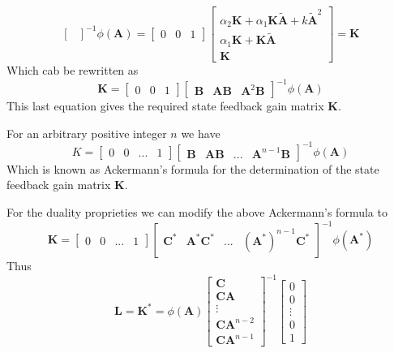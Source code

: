 \documentclass[12pt,a4paper,oneside]{book}
\begin{document}
\begin{onehalfspace}
\begin{equation}
\begin{bmatrix}
	\end{bmatrix}^{-1} \phi(\mathbf{A})=
	\begin{bmatrix} 
		0&0&1
	\end{bmatrix}
	\begin{bmatrix}
		\alpha_2\mathbf{K}+\alpha_1\mathbf{K}\tilde{\mathbf{A}}+k\tilde{\mathbf{A}}^2 \\ 
		\alpha_1\mathbf{K}+\mathbf{K}\tilde{\mathbf{A}} \\
		\mathbf{K}
	\end{bmatrix} = \mathbf{K}
\end{equation}
Which cab be rewritten as
\begin{equation*}
	\mathbf{K} = \begin{bmatrix} 
		0&0&1
	\end{bmatrix}
	\begin{bmatrix}
		\mathbf{B} & \mathbf{AB} & \mathbf{A}^2\mathbf{B}
	\end{bmatrix}^{-1} \phi(\mathbf{A})
\end{equation*}
This last equation gives the required state feedback gain matrix $\mathbf{K}$.

For an arbitrary positive integer $n$ we have
\begin{equation} \label{ackermann_7}
	K = \begin{bmatrix} 
		0&0&...&1
	\end{bmatrix}
	\begin{bmatrix}
		\mathbf{B} & \mathbf{AB} & ...& \mathbf{A}^{n-1}\mathbf{B}
	\end{bmatrix}^{-1} \phi(\mathbf{A})
\end{equation}
Which is known as Ackermann's formula for the determination of the state 
feedback gain matrix $\mathbf{K}$.

For the duality proprieties we can modify the above Ackermann's formula to
\begin{equation} \label{ackermann_8}
	\mathbf{K} = \begin{bmatrix} 
		0&0&...&1
	\end{bmatrix}
	\begin{bmatrix}
		\mathbf{C}^* & \mathbf{A}^*\mathbf{C}^* & ...& (\mathbf{A}^*)^{n-1}\mathbf{C}^*
	\end{bmatrix}^{-1} \phi(\mathbf{A}^*)
\end{equation}
Thus
\begin{equation} \label{ackermann_9}
	\mathbf{L} =\mathbf{K}^*= \phi(\mathbf{A}) \begin{bmatrix} 
		\mathbf{C} \\
		\mathbf{CA} \\
		\vdots \\
		\mathbf{CA}^{n-2} \\
		\mathbf{CA}^{n-1}
	\end{bmatrix}^{-1}
	\begin{bmatrix}
		0 \\
		0 \\
		\vdots \\
		0 \\
		1
	\end{bmatrix}
\end{equation}


\end{onehalfspace}
\end{document}
